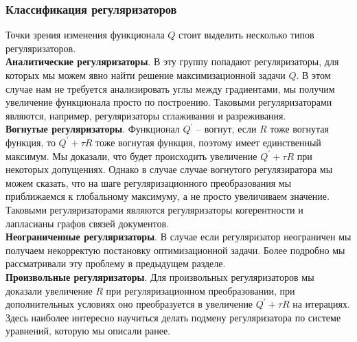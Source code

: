 \documentclass[12pt]{article}
\begin{document}
           \subsubsection{Классификация регуляризаторов}
Точки зрения изменения функционала $Q$ стоит выделить несколько типов регуляризаторов.\\
	 \textbf{Аналитические регуляризаторы}. В эту группу попадают регуляризаторы, для которых мы можем явно найти решение максимизационной задачи $Q$. В этом случае нам не требуется анализировать углы между градиентами, мы получим увеличение функционала просто по построению. Таковыми регуляризаторами являются, например, регуляризаторы сглаживания и разреживания.\\ 
	\textbf{Вогнутые регуляризаторы}. Функционал $Q^{\prime}$ -- вогнут, если $R$ тоже вогнутая функция, то $Q^{\prime} + \tau R$ тоже вогнутая функция, поэтому имеет единственный максимум. Мы доказали, что будет происходить увеличение $Q^{\prime} + \tau R$ при некоторых допущениях. Однако в случае случае вогнутого регулязиратора мы можем сказать, что на шаге регуляризационного преобразования мы приближаемся к глобальному максимуму, а не просто увеличиваем значение. Таковыми регуляризаторами являются регуляризаторы когерентности и лапласианы графов связей документов.\\
	\textbf{Неограниченные регуляризаторы}. В случае если регуляризатор неограничен мы получаем некорректую постановку оптимизационной задачи. Более подробно мы рассматривали эту проблему в предыдущем разделе.\\
	\textbf{Произвольные регуляризаторы}. Для произвольных регуляризаторов мы доказали увеличение $R$ при регуляризационном преобразовании, при дополнительных условиях оно преобразуется в увеличение $Q^{\prime} + \tau R$ на итерациях. Здесь наиболее интересно научиться делать подмену регуляризатора по системе уравнений, которую мы описали ранее.
\end{document}
